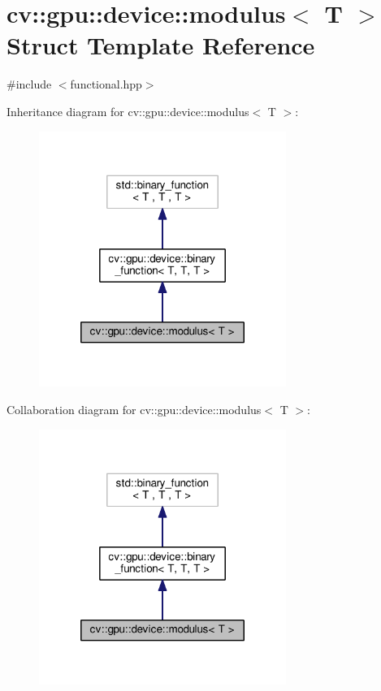 \hypertarget{structcv_1_1gpu_1_1device_1_1modulus}{\section{cv\-:\-:gpu\-:\-:device\-:\-:modulus$<$ T $>$ Struct Template Reference}
\label{structcv_1_1gpu_1_1device_1_1modulus}
}


{\ttfamily \#include $<$functional.\-hpp$>$}



Inheritance diagram for cv\-:\-:gpu\-:\-:device\-:\-:modulus$<$ T $>$\-:\nopagebreak
\begin{figure}[H]
\begin{center}
\leavevmode
\includegraphics[width=228pt]{structcv_1_1gpu_1_1device_1_1modulus__inherit__graph}
\end{center}
\end{figure}


Collaboration diagram for cv\-:\-:gpu\-:\-:device\-:\-:modulus$<$ T $>$\-:\nopagebreak
\begin{figure}[H]
\begin{center}
\leavevmode
\includegraphics[width=228pt]{structcv_1_1gpu_1_1device_1_1modulus__coll__graph}
\end{center}
\end{figure}
